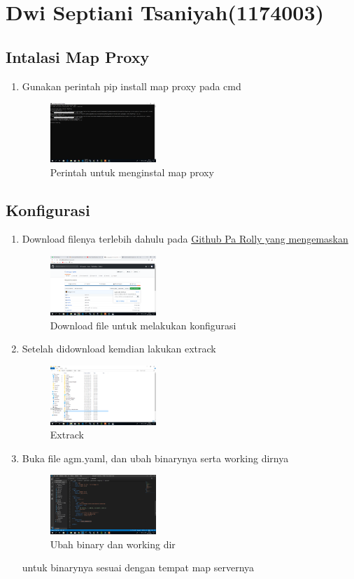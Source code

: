 \section{Dwi Septiani Tsaniyah(1174003)}
\subsection{Intalasi Map Proxy}
\begin{enumerate}
    \item Gunakan perintah pip install map proxy pada cmd
    \hfill\break
    \begin{figure}[H]
		\includegraphics[width=4cm]{figures/1174003/5/1.png}
		\centering
		\caption{Perintah untuk menginstal map proxy}
    \end{figure}
\end{enumerate}
\subsection{Konfigurasi}
\begin{enumerate}
    \item Download filenya terlebih dahulu pada \href{https://github.com/awangga/gede}{Github Pa Rolly yang mengemaskan}
    \hfill\break
    \begin{figure}[H]
		\includegraphics[width=4cm]{figures/1174003/5/2.png}
		\centering
		\caption{Download file untuk melakukan konfigurasi}
    \end{figure}
    \item Setelah didownload kemdian lakukan extrack
    \hfill\break
    \begin{figure}[H]
		\includegraphics[width=4cm]{figures/1174003/5/3.png}
		\centering
		\caption{Extrack}
    \end{figure}
    \item Buka file agm.yaml, dan ubah binarynya serta working dirnya
    \hfill\break
    \begin{figure}[H]
		\includegraphics[width=4cm]{figures/1174003/5/4.png}
		\centering
		\caption{Ubah binary dan working dir}
    \end{figure}
    untuk binarynya sesuai dengan tempat map servernya
\end{enumerate}

